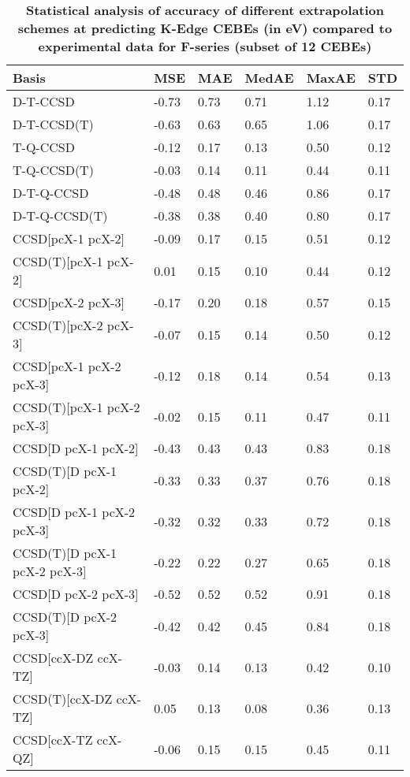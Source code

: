 \begin{table}
  \caption{\textbf{Statistical analysis of accuracy of different extrapolation schemes at predicting K-Edge CEBEs (in eV) compared to experimental data for F-series (subset of 12 CEBEs)}}
  \begin{tabular}{l l l l l l }
    \toprule
    \textbf{Basis} & \textbf{MSE} & \textbf{MAE} & \textbf{MedAE} & \textbf{MaxAE} & \textbf{STD} \\ 
    \midrule
    D-T-CCSD & -0.73 & 0.73 & 0.71 & 1.12 & 0.17 \\ 
    D-T-CCSD(T) & -0.63 & 0.63 & 0.65 & 1.06 & 0.17 \\ 
    T-Q-CCSD & -0.12 & 0.17 & 0.13 & 0.50 & 0.12 \\ 
    T-Q-CCSD(T) & -0.03 & 0.14 & 0.11 & 0.44 & 0.11 \\ 
    D-T-Q-CCSD & -0.48 & 0.48 & 0.46 & 0.86 & 0.17 \\ 
    D-T-Q-CCSD(T) & -0.38 & 0.38 & 0.40 & 0.80 & 0.17 \\ 
    CCSD[pcX-1 pcX-2] & -0.09 & 0.17 & 0.15 & 0.51 & 0.12 \\ 
    CCSD(T)[pcX-1 pcX-2] & 0.01 & 0.15 & 0.10 & 0.44 & 0.12 \\ 
    CCSD[pcX-2 pcX-3] & -0.17 & 0.20 & 0.18 & 0.57 & 0.15 \\ 
    CCSD(T)[pcX-2 pcX-3] & -0.07 & 0.15 & 0.14 & 0.50 & 0.12 \\ 
    CCSD[pcX-1 pcX-2 pcX-3] & -0.12 & 0.18 & 0.14 & 0.54 & 0.13 \\ 
    CCSD(T)[pcX-1 pcX-2 pcX-3] & -0.02 & 0.15 & 0.11 & 0.47 & 0.11 \\ 
    CCSD[D pcX-1 pcX-2] & -0.43 & 0.43 & 0.43 & 0.83 & 0.18 \\ 
    CCSD(T)[D pcX-1 pcX-2] & -0.33 & 0.33 & 0.37 & 0.76 & 0.18 \\ 
    CCSD[D pcX-1 pcX-2 pcX-3] & -0.32 & 0.32 & 0.33 & 0.72 & 0.18 \\ 
    CCSD(T)[D pcX-1 pcX-2 pcX-3] & -0.22 & 0.22 & 0.27 & 0.65 & 0.18 \\ 
    CCSD[D pcX-2 pcX-3] & -0.52 & 0.52 & 0.52 & 0.91 & 0.18 \\ 
    CCSD(T)[D pcX-2 pcX-3] & -0.42 & 0.42 & 0.45 & 0.84 & 0.18 \\ 
    CCSD[ccX-DZ ccX-TZ] & -0.03 & 0.14 & 0.13 & 0.42 & 0.10 \\ 
    CCSD(T)[ccX-DZ ccX-TZ] & 0.05 & 0.13 & 0.08 & 0.36 & 0.13 \\ 
    CCSD[ccX-TZ ccX-QZ] & -0.06 & 0.15 & 0.15 & 0.45 & 0.11 \\ 

\end{tabular}
\end{table}
